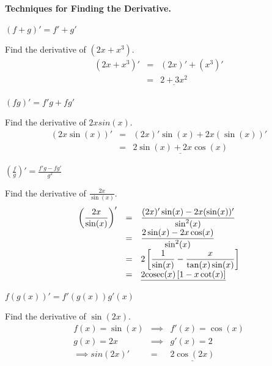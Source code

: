 \documentclass[11pt,a4paper]{article}
\begin{document}
\textbf{Techniques for Finding the Derivative.}\\

\subtitle{Sum Rule}
\begin{center}$(f + g)' = f' + g'$\end{center}

\subtitle{Example}
Find the derivative of $(2x + x^3)$.
\[\begin{array}{rcl}
(2x + x^3)' &=& (2x)' + (x^3)'\\
&=& \underline{2 + 3x^2}
\end{array}\]

\newpage
\subtitle{Product Rule}
\begin{center}$(fg)' = f'g + fg'$\end{center}

\subtitle{Example}
Find the derivative of $2xsin(x)$.
\[\begin{array}{rcl}
(2x\sin(x))' &=& (2x)'\sin(x) + 2x(\sin(x))'\\
&=& \underline{2\sin(x) + 2x\cos(x)}
\end{array}\]

\subtitle{Quotient Rule}
\begin{center}$\displaystyle{\left(\frac{f}{g}\right)' = \frac{f'g - fg'}{g^2}}$\end{center}

\subtitle{Example}
Find the derivative of $\displaystyle{\frac{2x}{\sin(x)}}$.
\[\begin{array}{rcl}
\displaystyle{\left(\frac{2x}{\sin(x)}\right)'} &=&\displaystyle{\frac{(2x)'\sin(x) - 2x(\sin(x))'}{\sin^2(x)} }\\
&=& \displaystyle{\frac{2\sin(x) - 2x\cos(x)}{\sin^2(x)}}\\
&=& \displaystyle{2\left[\frac{1}{\sin(x)} - \frac{x}{\tan(x)\sin(x)}\right]}\\
&=& \underline{\displaystyle{2\mathrm{cosec}(x) \left[1 - x\cot(x) \right]}}
\end{array}\]

\subtitle{Chain Rule}
\begin{center}$f(g(x))' = f'(g(x))g'(x)$\end{center}

\subtitle{Example}
Find the derivative of $\sin(2x)$.
\[\begin{array}{rcl}
f(x) = \sin(x) &\implies& f'(x) = \cos(x)\\
g(x) = 2x &\implies& g'(x) = 2\\
\implies sin(2x)' &=& \underline{2\cos(2x)}
\end{array}\]\\
\end{document}

